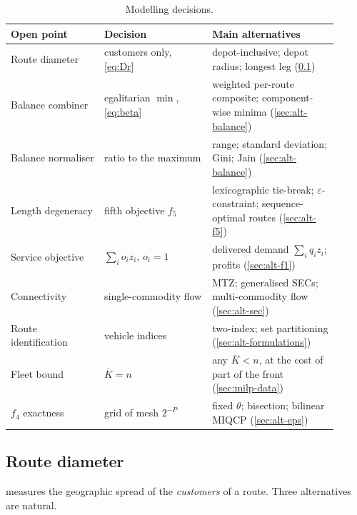\documentclass[11pt,a4paper]{article}
\theoremstyle{definition}
\theoremstyle{plain}
\begin{document}
\begin{table}[htbp]
\centering
\small
\begin{tabular}{@{}>{\raggedright\arraybackslash}p{0.26\linewidth}>{\raggedright\arraybackslash}p{0.30\linewidth}>{\raggedright\arraybackslash}p{0.35\linewidth}@{}}
\toprule
Open point & Decision & Main alternatives \\
\midrule
Route diameter & customers only, \eqref{eq:Dr} &
  depot-inclusive; depot radius; longest leg (\cref{sec:alt-diameter}) \\
Balance combiner & egalitarian $\min$, \eqref{eq:beta} &
  weighted per-route composite; component-wise minima
  (\cref{sec:alt-balance}) \\
Balance normaliser & ratio to the maximum &
  range; standard deviation; Gini; Jain (\cref{sec:alt-balance}) \\
Length degeneracy & fifth objective $f_5$ &
  lexicographic tie-break; $\varepsilon$-constraint; sequence-optimal routes
  (\cref{sec:alt-f5}) \\
Service objective & $\sum_i o_i z_i$, $o_i = 1$ &
  delivered demand $\sum_i q_i z_i$; profits (\cref{sec:alt-f1}) \\
Connectivity & single-commodity flow &
  MTZ; generalised SECs; multi-commodity flow (\cref{sec:alt-sec}) \\
Route identification & vehicle indices &
  two-index; set partitioning (\cref{sec:alt-formulations}) \\
Fleet bound & $\overline{K} = n$ &
  any $\overline{K} < n$, at the cost of part of the front
  (\cref{sec:milp-data}) \\
$f_4$ exactness & grid of mesh $2^{-P}$ &
  fixed $\theta$; bisection; bilinear MIQCP (\cref{sec:alt-eps}) \\
\bottomrule
\end{tabular}
\caption{Modelling decisions.}
\label{tab:decisions}
\end{table}

\subsection{Route diameter}
\label{sec:alt-diameter}

 measures the geographic spread of the \emph{customers} of a route.
Three alternatives are natural.
\end{document}
